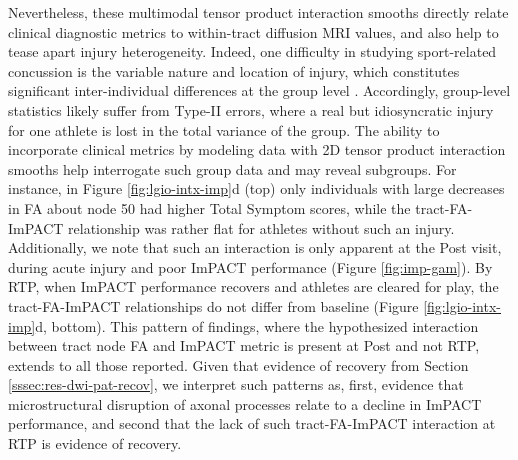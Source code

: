 \documentclass[12pt]{article}
\begin{document}
Nevertheless, these multimodal tensor product interaction smooths directly relate clinical diagnostic metrics to within-tract diffusion MRI values, and also help to tease apart injury heterogeneity. Indeed, one difficulty in studying sport-related concussion is the variable nature and location of injury, which constitutes significant inter-individual differences at the group level \parencite{lindsey2023DiffusionWeightedImagingMild}. Accordingly, group-level statistics likely suffer from Type-II errors, where a real but idiosyncratic injury for one athlete is lost in the total variance of the group. The ability to incorporate clinical metrics by modeling data with 2D tensor product interaction smooths help interrogate such group data and may reveal subgroups. For instance, in Figure \ref{fig:lgio-intx-imp}d (top) only individuals with large decreases in FA about node 50 had higher Total Symptom scores, while the tract-FA-ImPACT relationship was rather flat for athletes without such an injury. Additionally, we note that such an interaction is only apparent at the Post visit, during acute injury and poor ImPACT performance (Figure \ref{fig:imp-gam}). By RTP, when ImPACT performance recovers and athletes are cleared for play, the tract-FA-ImPACT relationships do not differ from baseline (Figure \ref{fig:lgio-intx-imp}d, bottom). This pattern of findings, where the hypothesized interaction between tract node FA and ImPACT metric is present at Post and not RTP, extends to all those reported. Given that evidence of recovery from Section \ref{sssec:res-dwi-pat-recov}, we interpret such patterns as, first, evidence that microstructural disruption of axonal processes relate to a decline in ImPACT performance, and second that the lack of such tract-FA-ImPACT interaction at RTP is evidence of recovery.
\end{document}
